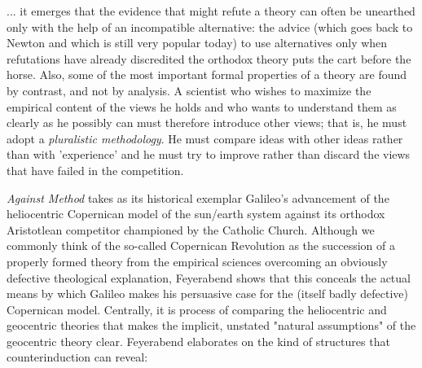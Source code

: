 \begin{longquote}

... it emerges that the evidence that might refute a
theory can often be unearthed only with the help of an incompatible
alternative: the advice (which goes back to Newton and which is still
very popular today) to use alternatives only when refutations have
already discredited the orthodox theory puts the cart before the
horse. Also, some of the most important formal properties of a theory
are found by contrast, and not by analysis. A scientist who wishes to
maximize the empirical content of the views he holds and who wants
to understand them as clearly as he possibly can must therefore
introduce other views; that is, he must adopt a \textit{pluralistic methodology}.
He must compare ideas with other ideas rather than with
'experience' and he must try to improve rather than discard the views
that have failed in the competition.\cite[p.20]{Feyerabend1993}

\end{longquote}

\textit{Against Method} takes as its historical exemplar Galileo's advancement of the heliocentric Copernican model of the sun/earth system against its orthodox Aristotlean competitor championed by the Catholic Church. Although we commonly think of the so-called Copernican Revolution as the succession of a properly formed theory from the empirical sciences overcoming an obviously defective theological explanation, Feyerabend shows that this conceals the actual means by which Galileo makes his persuasive case for the (itself badly defective) Copernican model. Centrally, it is process of comparing the heliocentric and geocentric theories that makes the implicit, unstated "natural assumptions" of the geocentric theory clear. Feyerabend elaborates on the kind of structures that counterinduction can reveal:

